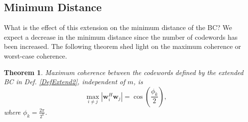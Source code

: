\documentclass[lettersize,journal,onecolumn]{IEEEtran}
\newtheorem{theorem}{Theorem}
\begin{document}
\subsection{Minimum Distance }
What is the effect of this extension on the minimum distance of the BC? We expect a decrease in the minimum distance since the number of codewords has been increased. The following theorem shed light on the maximum coherence or worst-case coherence.
\begin{theorem}\label{minDistanceExtGen}
	Maximum coherence between the codewords defined by the extended BC in Def. \ref{DefExtend2}, independent of $m$, is
	\begin{equation}
		\underset{i \neq j}{\max} \left\lvert \mathbf{w}_i^H \mathbf{w}_j \right\rvert = \cos\left(\frac{\phi_k}{2}\right),
	\end{equation}
where $\phi_k = \frac{2\pi}{2^k}$.
\end{theorem}
\end{document}
